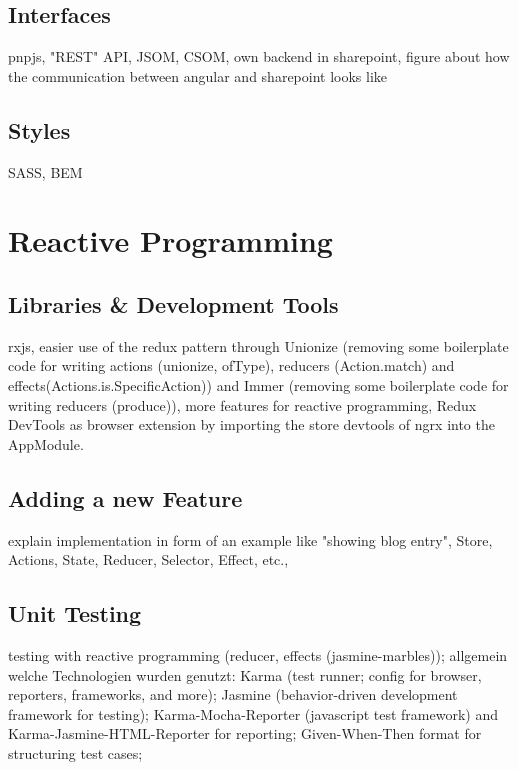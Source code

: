 \documentclass[Bachelor,BIF,english]{twbook}
\begin{document}
\subsection{Interfaces}
pnpjs, "REST" API, JSOM, CSOM, own backend in sharepoint, figure about how the communication between angular and sharepoint looks like

\subsection{Styles}
SASS, BEM

\section{Reactive Programming}

\subsection{Libraries \& Development Tools}
rxjs, easier use of the redux pattern through Unionize \cite{Unionize} (removing some boilerplate code for writing actions (unionize, ofType), reducers (Action.match) and effects(Actions.is.SpecificAction)) and Immer \cite{Immer} (removing some boilerplate code for writing reducers (produce)), more features for reactive programming, Redux DevTools \cite{ReduxDevTools} as browser extension by importing the store devtools of ngrx into the AppModule.

\subsection{Adding a new Feature}
explain implementation in form of an example like "showing blog entry", Store, Actions, State, Reducer, Selector, Effect, etc., 

\subsection{Unit Testing}
testing with reactive programming (reducer, effects (jasmine-marbles)); allgemein welche Technologien wurden genutzt: Karma \cite{Karma} (test runner; config for browser, reporters, frameworks, and more); Jasmine \cite{Jasmine} (behavior-driven development framework for testing); Karma-Mocha-Reporter \cite{KarmaMocha} (javascript test framework) and Karma-Jasmine-HTML-Reporter \cite{KarmaJasmineHTML} for reporting; Given-When-Then \cite{GivenWhenThen} format for structuring test cases; 
\end{document}

